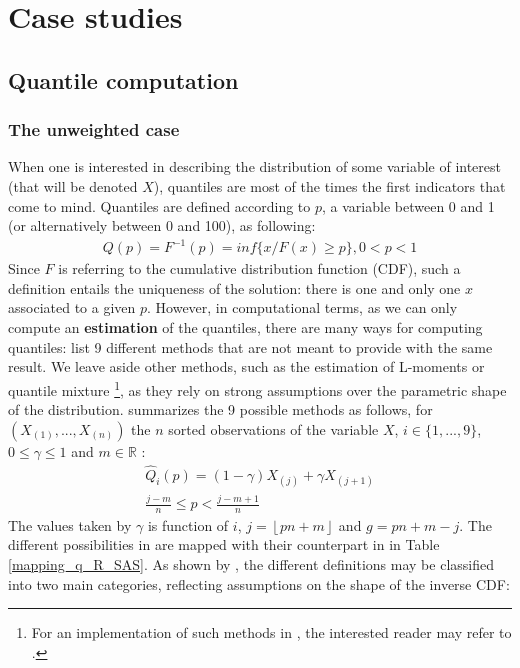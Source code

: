 \section{Case studies}

\subsection{Quantile computation}

\subsubsection{The unweighted case}

When one is interested in describing the distribution of some variable of interest (that will be denoted $X$), quantiles are most of the times the first indicators that come to mind. Quantiles are defined according to $p$, a variable between 0 and 1 (or alternatively between 0 and 100), as following:
\begin{eqnarray}
Q(p) = F^{-1}(p) = inf\{x/ F(x) \geq p\}, 0<p<1
\end{eqnarray}
Since $F$ is referring to the cumulative distribution function (CDF), such a definition entails the uniqueness of the solution: there is one and only one $x$ associated to a given $p$. However, in computational terms, as we can only compute an \textbf{estimation} of the quantiles, there are many ways for computing quantiles: \cite{hyndman1996sample} list 9 different methods that are not meant to provide with the same result. We leave aside other methods, such as the estimation of L-moments or quantile mixture \cite{hosking1990moments} \cite{sheather1990kernel}\footnote{For an implementation of such methods in \R, the interested reader may refer to \cite{karvanen2011lmoments}.}, as they rely on strong assumptions over the parametric shape of the distribution. \cite{hyndman1996sample} summarizes the 9 possible methods as follows, for $(X_{(1)},...,X_{(n)})$ the $n$ sorted observations of the variable $X$, $i \in \{1,...,9\}$, $0 \leq \gamma \leq 1$ and $m \in \mathbb{R}$  :
\begin{eqnarray}
\hat{Q}_i(p) = (1-\gamma) X_{(j)} + \gamma X_{(j+1)} \\
\frac{j-m}{n} \leq p < \frac{j-m+1}{n}
\end{eqnarray}
The values taken by $\gamma$ is function of $i$, $j = \left\lfloor pn + m \right\rfloor$ and $g = pn + m -j$. The different possibilities in \SAS are mapped with their counterpart in \R in Table \ref{mapping_q_R_SAS}. As shown by \cite{hyndman1996sample}, the different definitions may be classified into two main categories, reflecting assumptions on the shape of the inverse CDF:
